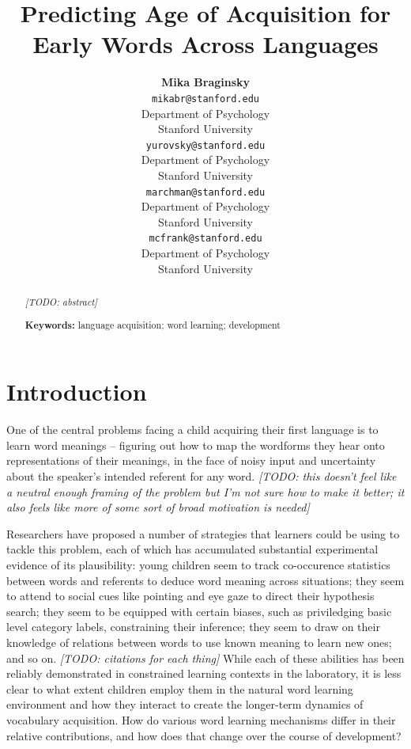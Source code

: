 \documentclass[10pt, letterpaper]{article}
\title{Predicting Age of Acquisition for Early Words Across Languages}
\author{{\large \bf Mika Braginsky} \\ \texttt{mikabr@stanford.edu} \\ Department of Psychology \\ Stanford University \And {\large \bf Daniel Yurovsky} \\ \texttt{yurovsky@stanford.edu} \\ Department of Psychology \\ Stanford University \And {\large \bf Virginia A. Marchman} \\ \texttt{marchman@stanford.edu} \\ Department of Psychology \\ Stanford University \And {\large \bf Michael C. Frank} \\ \texttt{mcfrank@stanford.edu} \\ Department of Psychology \\ Stanford University}
\begin{document}
\maketitle

\begin{abstract}
\emph{{[}TODO: abstract{]}}

\textbf{Keywords:}
language acquisition; word learning; development
\end{abstract}

\section{Introduction}\label{introduction}

One of the central problems facing a child acquiring their first
language is to learn word meanings -- figuring out how to map the
wordforms they hear onto representations of their meanings, in the face
of noisy input and uncertainty about the speaker's intended referent for
any word. \emph{{[}TODO: this doesn't feel like a neutral enough framing
of the problem but I'm not sure how to make it better; it also feels
like more of some sort of broad motivation is needed{]}}

Researchers have proposed a number of strategies that learners could be
using to tackle this problem, each of which has accumulated substantial
experimental evidence of its plausibility: young children seem to track
co-occurence statistics between words and referents to deduce word
meaning across situations; they seem to attend to social cues like
pointing and eye gaze to direct their hypothesis search; they seem to be
equipped with certain biases, such as priviledging basic level category
labels, constraining their inference; they seem to draw on their
knowledge of relations between words to use known meaning to learn new
ones; and so on. \emph{{[}TODO: citations for each thing{]}} While each
of these abilities has been reliably demonstrated in constrained
learning contexts in the laboratory, it is less clear to what extent
children employ them in the natural word learning environment and how
they interact to create the longer-term dynamics of vocabulary
acquisition. How do various word learning mechanisms differ in their
relative contributions, and how does that change over the course of
development?
\end{document}
